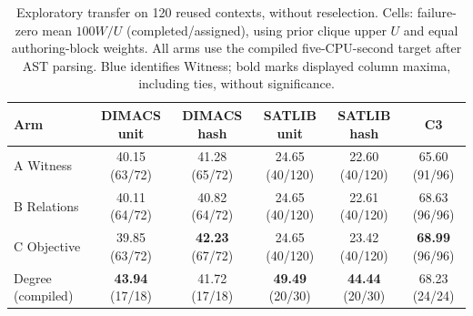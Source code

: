 \begin{table}[t]
\centering
\caption{Exploratory transfer on 120 reused contexts, without reselection. Cells: failure-zero mean $100W/U$ (completed/assigned), using prior clique upper $U$ and equal authoring-block weights. All arms use the compiled five-CPU-second target after AST parsing. Blue identifies Witness; bold marks displayed column maxima, including ties, without significance.}
\label{tab:matched-transfer}
\setlength{\tabcolsep}{4pt}
\begin{tabular}{lccccc}
\toprule
Arm & DIMACS unit & DIMACS hash & SATLIB unit & SATLIB hash & C3 \\
\midrule
\rowcolor{blue!7} A Witness & 40.15 (63/72) & 41.28 (65/72) & 24.65 (40/120) & 22.60 (40/120) & 65.60 (91/96) \\
B Relations & 40.11 (64/72) & 40.82 (64/72) & 24.65 (40/120) & 22.61 (40/120) & 68.63 (96/96) \\
C Objective & 39.85 (63/72) & \textbf{42.23} (67/72) & 24.65 (40/120) & 23.42 (40/120) & \textbf{68.99} (96/96) \\
Degree (compiled) & \textbf{43.94} (17/18) & 41.72 (17/18) & \textbf{49.49} (20/30) & \textbf{44.44} (20/30) & 68.23 (24/24) \\
\bottomrule
\end{tabular}
\end{table}
